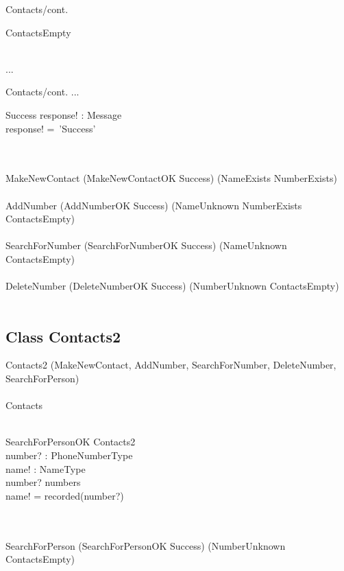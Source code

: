 \documentclass[12pt]{article}
\begin{document}
\begin{spacing}{1.5}
\begin{class}{Contacts/cont.}
\begin{op}{ContactsEmpty}
\end{op}\\
...
\end{class}
\newpage
\begin{class}{Contacts/cont.}
...
\also
\begin{op}{Success}
response! : Message\\
\ST
response! =~'Success'
\end{op}\\
\mbox{}\\
MakeNewContact \sdef (MakeNewContactOK \land Success) \oplus (NameExists \lor NumberExists)  \\
\mbox{}\\
AddNumber \sdef (AddNumberOK \land Success) \oplus (NameUnknown \lor NumberExists \lor ContactsEmpty)  \\
\mbox{}\\
SearchForNumber \sdef (SearchForNumberOK \land Success) \oplus (NameUnknown \lor ContactsEmpty)  \\
\mbox{}\\
DeleteNumber \sdef (DeleteNumberOK \land Success) \oplus (NumberUnknown \lor ContactsEmpty)  \\
\mbox{}\\
\end{class}
\newpage
\subsection{Class Contacts2}
\begin{class}{Contacts2}
\also
\upharpoonright (MakeNewContact, AddNumber, SearchForNumber, DeleteNumber, \\
SearchForPerson) 
\\~\\ Contacts  \\~\\
\begin{op}{SearchForPersonOK}
\Xi Contacts2\\
number? : PhoneNumberType\\
name! : NameType\\
\ST
number? \in numbers\\
name! = recorded(number?)
\end{op}\\
\mbox{}\\
SearchForPerson \sdef (SearchForPersonOK \land Success) \oplus (NumberUnknown \lor ContactsEmpty)  \\
\mbox{}\\
\end{class}


\end{spacing}
\end{document}

